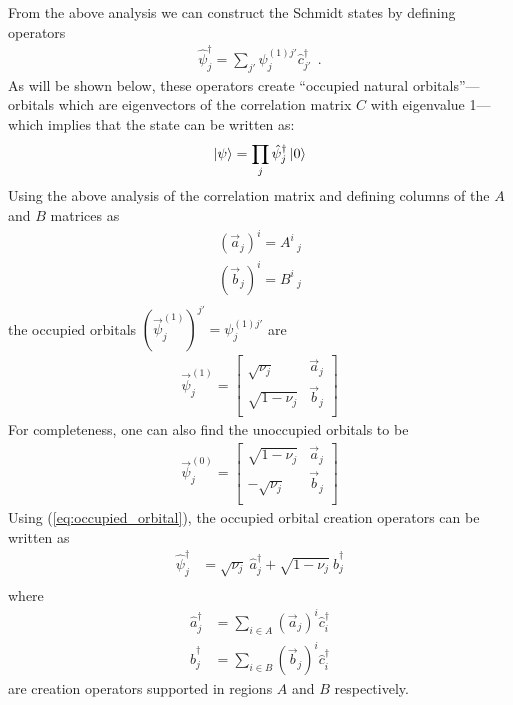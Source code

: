 \documentclass[aps, superscriptaddress, floatfix, onecolumn]{revtex4-2}
\begin{document}
From the above analysis we can construct the Schmidt states by defining operators
\begin{align}
\hat{\psi}^\dagger_j = \sum_{j'} \psi^{(1) j'}_j \hat{c}^\dagger_{j'} \ \ .
\end{align}
As will be shown below, these operators create ``occupied natural orbitals''---orbitals which are
eigenvectors of the correlation matrix $C$ with eigenvalue 1---which implies that
the state can be written as:
\begin{align}
\ket{\psi} = \prod_{j} \hat{\psi}^\dagger_j \ket{0}
\end{align}
Using the above analysis of the correlation matrix and defining columns of the $A$ and $B$ matrices as
\begin{align}
(\vec{a}_j)^{i} = A^i\,_j  \\
(\vec{b}_j)^{i} = B^i\,_j  \\
\end{align}
the occupied orbitals $(\vec{\psi}^{(1)}_j)^{j'} = \psi^{(1) j'}_j$ are 
\begin{align}
\vec{\psi}^{(1)}_j = \begin{bmatrix}
\sqrt{\nu_j} & \vec{a}_j \\
\sqrt{1-\nu_j} &  \vec{b}_j \\
\end{bmatrix} \label{eq:occupied_orbital}
\end{align}
For completeness, one can also find the unoccupied orbitals to be 
\begin{align}
\vec{\psi}^{(0)}_j = \begin{bmatrix}
\sqrt{1-\nu_j} & \vec{a}_j \\
- \sqrt{\nu_j} &  \vec{b}_j \\
\end{bmatrix}
\end{align}
Using (\ref{eq:occupied_orbital}), the occupied orbital creation operators can be written as
\begin{align}
\hat{\psi}^\dagger_j & = \sqrt{\nu_j} \ \hat{a}^\dagger_j + \sqrt{1-\nu_j} \ \hat{b}^\dagger_{j} \\
\end{align}
where
\begin{align}
\hat{a}^\dagger_j & = \sum_{i \in A} (\vec{a}_j)^i \hat{c}^\dagger_i \\
\hat{b}^\dagger_j & = \sum_{i \in B} (\vec{b}_j)^i \hat{c}^\dagger_i
\end{align}
are creation operators supported in regions $A$ and $B$ respectively.
\end{document}
